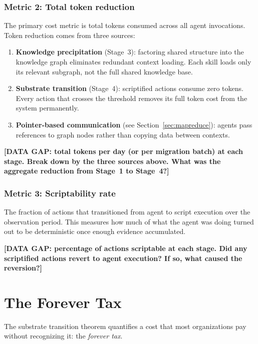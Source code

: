 \documentclass[11pt]{article}
\theoremstyle{definition}
\begin{document}
\subsubsection{Metric 2: Total token reduction}

The primary cost metric is total tokens consumed across all agent
invocations. Token reduction comes from three sources:

\begin{enumerate}
\item \textbf{Knowledge precipitation} (Stage~3): factoring shared
   structure into the knowledge graph eliminates redundant context
   loading. Each skill loads only its relevant subgraph, not the full
   shared knowledge base.
\item \textbf{Substrate transition} (Stage~4): scriptified actions
   consume zero tokens. Every action that crosses the threshold
   removes its full token cost from the system permanently.
\item \textbf{Pointer-based communication} (see
   Section~\ref{sec:mapreduce}): agents pass references to graph
   nodes rather than copying data between contexts.
\end{enumerate}

\textbf{[DATA GAP: total tokens per day (or per migration batch)
at each stage. Break down by the three sources above. What was the
aggregate reduction from Stage~1 to Stage~4?]}

\subsubsection{Metric 3: Scriptability rate}

The fraction of actions that transitioned from agent to script
execution over the observation period. This measures how much of
what the agent was doing turned out to be deterministic once enough
evidence accumulated.

\textbf{[DATA GAP: percentage of actions scriptable at each stage.
Did any scriptified actions revert to agent execution? If so, what
caused the reversion?]}

\section{The Forever Tax}
\label{sec:forever-tax}

The substrate transition theorem quantifies a cost that most
organizations pay without recognizing it: the \emph{forever tax}.
\end{document}
